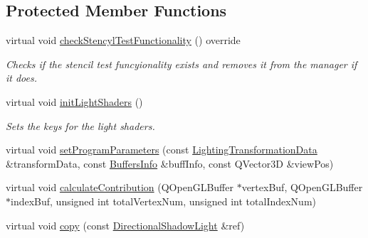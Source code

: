 \subsection*{Protected Member Functions}
\begin{DoxyCompactItemize}
\item 
\mbox{\label{class_geometry_engine_1_1_geometry_world_item_1_1_geometry_light_1_1_directional_shadow_light_adb8abba4cb474289093378739b5cd862}} 
virtual void \mbox{\hyperlink{class_geometry_engine_1_1_geometry_world_item_1_1_geometry_light_1_1_directional_shadow_light_adb8abba4cb474289093378739b5cd862}{check\+Stencyl\+Test\+Functionality}} () override
\begin{DoxyCompactList}\small\item\em Checks if the stencil test funcyionality exists and removes it from the manager if it does. \end{DoxyCompactList}\item 
\mbox{\label{class_geometry_engine_1_1_geometry_world_item_1_1_geometry_light_1_1_directional_shadow_light_a3e31cf04dc9387c4c66a2a958c7281c7}} 
virtual void \mbox{\hyperlink{class_geometry_engine_1_1_geometry_world_item_1_1_geometry_light_1_1_directional_shadow_light_a3e31cf04dc9387c4c66a2a958c7281c7}{init\+Light\+Shaders}} ()
\begin{DoxyCompactList}\small\item\em Sets the keys for the light shaders. \end{DoxyCompactList}\item 
virtual void \mbox{\hyperlink{class_geometry_engine_1_1_geometry_world_item_1_1_geometry_light_1_1_directional_shadow_light_a69e057e57c62712cfeeb09863f0082ef}{set\+Program\+Parameters}} (const \mbox{\hyperlink{class_geometry_engine_1_1_lighting_transformation_data}{Lighting\+Transformation\+Data}} \&transform\+Data, const \mbox{\hyperlink{class_geometry_engine_1_1_buffers_info}{Buffers\+Info}} \&buff\+Info, const Q\+Vector3D \&view\+Pos)
\item 
virtual void \mbox{\hyperlink{class_geometry_engine_1_1_geometry_world_item_1_1_geometry_light_1_1_directional_shadow_light_a712d0b0a0573ebd246a4a8aa6b2b667a}{calculate\+Contribution}} (Q\+Open\+G\+L\+Buffer $\ast$vertex\+Buf, Q\+Open\+G\+L\+Buffer $\ast$index\+Buf, unsigned int total\+Vertex\+Num, unsigned int total\+Index\+Num)
\item 
virtual void \mbox{\hyperlink{class_geometry_engine_1_1_geometry_world_item_1_1_geometry_light_1_1_directional_shadow_light_a9dfe76fbcd9c6f7047d99d7eff78c6a5}{copy}} (const \mbox{\hyperlink{class_geometry_engine_1_1_geometry_world_item_1_1_geometry_light_1_1_directional_shadow_light}{Directional\+Shadow\+Light}} \&ref)
\end{DoxyCompactItemize}
